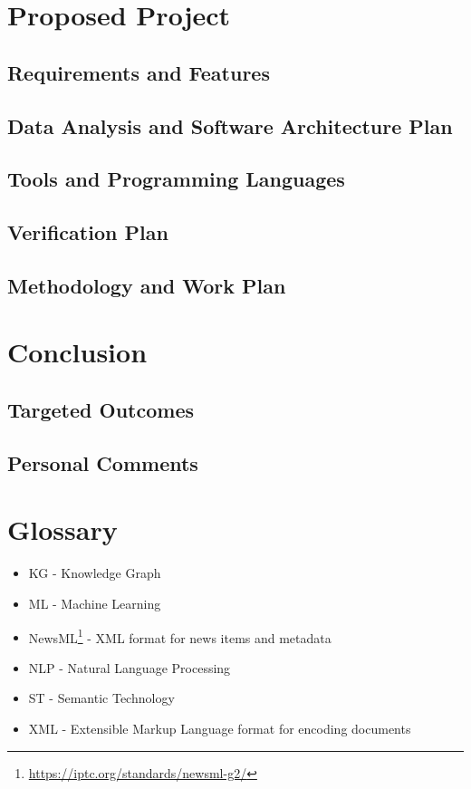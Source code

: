 \documentclass[11pt]{article}   	%
\begin{document}
\newpage
\section{Proposed Project}
\subsection{Requirements and Features}
\subsection{Data Analysis and Software Architecture Plan}
\subsection{Tools and Programming Languages}
\subsection{Verification Plan}
\subsection{Methodology and Work Plan}

\newpage
\section{Conclusion}
\subsection{Targeted Outcomes}
\subsection{Personal Comments}

\newpage
\section{Glossary}
\begin{itemize}
\item KG - Knowledge Graph
\item ML - Machine Learning
\item NewsML\footnote{\url{https://iptc.org/standards/newsml-g2/}} - XML format for news items and metadata
\item NLP - Natural Language Processing
\item ST - Semantic Technology
\item XML - Extensible Markup Language format for encoding documents
\end{itemize}

\newpage


\end{document}
